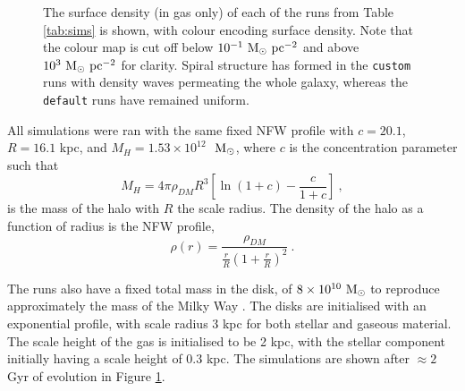 \begin{figure}[!ht]
    \leavevmode\rlap{\usebox{\graphicsbox}}%
    \begin{minipage}[b]{0.63\wd\graphicsbox}%
        \caption{The surface density (in gas only) of each of the runs from Table \ref{tab:sims} is shown, with colour encoding surface density. Note that the colour map is cut off below $10^{-1} ~\mathrm{M}_{\odot} ~\mathrm{pc}^{-2}$ and above $10^3 ~\mathrm{M}_{\odot} ~\mathrm{pc}^{-2}$ for clarity. Spiral structure has formed in the {\tt custom} runs with density waves permeating the whole galaxy, whereas the {\tt default} runs have remained uniform.}
        \label{fig:sdbig}
    \end{minipage}\hspace*{0.33\wd\graphicsbox}%
\end{figure}

All simulations were ran with the same fixed NFW profile with $c = 20.1$, $R = 16.1$ kpc, and $M_{H} = 1.53 \times 10^{12}$ $~\mathrm{M}_{\odot}$, where $c$ is the concentration parameter such that
$$
    M_{H} = 4\pi \rho_{DM} R^3 \left[ \ln (1 + c) - \frac{c}{1+c} \right]~,
$$
is the mass of the halo with $R$ the scale radius.
The density of the halo as a function of radius is the NFW profile,
\begin{equation}
    \rho(r) = \frac{\rho_{DM}}{\frac{r}{R} \left( 1 + \frac{r}{R} \right)^2}~.
    \label{eqn:nfw}
\end{equation}

The runs also have a fixed total mass in the disk, of $8\times10^{10} ~\mathrm{M}_{\odot}$ to reproduce approximately the mass of the Milky Way \citep{nakanishi_three-dimensional_2016}.
The disks are initialised with an exponential profile, with scale radius $3$ kpc for both stellar and gaseous material.
The scale height of the gas is initialised to be 2 kpc, with the stellar component initially having a scale height of 0.3 kpc.
The simulations are shown after $\approx 2$ Gyr of evolution in Figure \ref{fig:sdbig}. 
